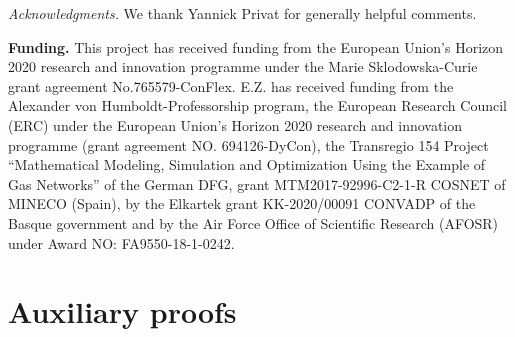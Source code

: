 \documentclass[11pt, a4paper, reqno]{amsart}
\theoremstyle{plain}
\numberwithin{equation}{section}
\begin{document}
	\noindent
	\textit{Acknowledgments.} We thank Yannick Privat for generally helpful comments.
	\smallskip
	
	\noindent
	{\footnotesize \textbf{Funding.} This project has received funding from the European Union's Horizon 2020 research and innovation programme under the Marie Sklodowska-Curie grant agreement No.765579-ConFlex. E.Z. has received funding from the Alexander von Humboldt-Professorship program, the European Research Council (ERC) under the European Union’s Horizon 2020 research and innovation programme (grant agreement NO. 694126-DyCon), the Transregio 154 Project “Mathematical Modeling, Simulation and Optimization Using the Example of Gas Networks” of the German DFG, grant MTM2017-92996-C2-1-R COSNET of MINECO (Spain), by the Elkartek grant KK-2020/00091 CONVADP of the Basque government and by the Air Force Office of Scientific Research (AFOSR) under Award NO: FA9550-18-1-0242.
	}
	

\appendix
	
	\section{Auxiliary proofs}
	
\end{document}
